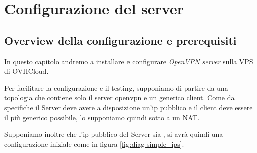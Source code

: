 \chapter{Configurazione del server}
\label{ch:server}


\section{Overview della configurazione e prerequisiti}
\label{sec:overview_server}

In questo capitolo andremo a installare e configurare \textit{OpenVPN server} sulla VPS di OVHCloud.

Per facilitare la configurazione e il testing, supponiamo di partire da una topologia che contiene solo il server openvpn e un generico client. Come da specifiche il Server deve avere a disposizione un'ip pubblico e il client deve essere il più generico possibile, lo supponiamo quindi sotto a un NAT.

Supponiamo inoltre che l'ip pubblico del Server sia , si avrà quindi una configurazione iniziale come in figura \ref{fig:diag-simple_ips}.


